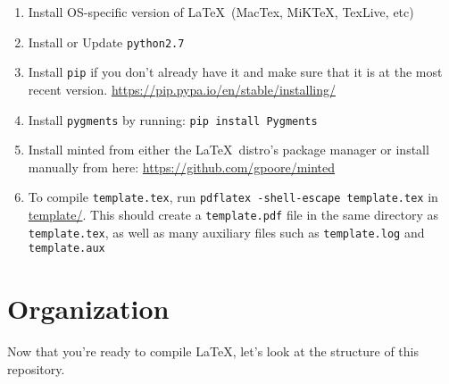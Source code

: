 \documentclass[11pt,fleqn]{article}
\begin{document}
\begin{enumerate}
\item
Install OS-specific version of \LaTeX\ (MacTex, MiKTeX, TexLive, etc)

\item
Install or Update \texttt{python2.7}

\item
Install \texttt{pip} if you don't already have it and make sure that it is at the most recent
version. \url{https://pip.pypa.io/en/stable/installing/}

\item
Install \texttt{pygments} by running: \texttt{pip install Pygments}

\item
Install minted from either the \LaTeX\ distro's package manager or install manually from here: 
\url{https://github.com/gpoore/minted}

\item
To compile \texttt{template.tex}, run \texttt{pdflatex -shell-escape template.tex} in \underline{template/}. This should create a \texttt{template.pdf} file in the same directory as \texttt{template.tex}, as well as many auxiliary files such as \texttt{template.log} and \texttt{template.aux}
\end{enumerate}


\section*{Organization}
Now that you're ready to compile \LaTeX, let's look at the structure of this repository.
\end{document}

